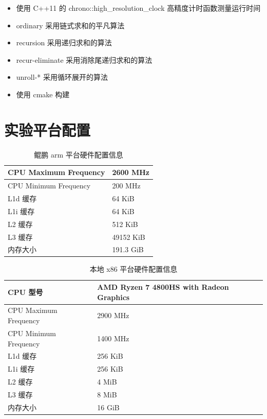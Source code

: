 \documentclass[a4paper]{article}
\begin{document}
\begin{itemize}
  \item 使用 C++11 的 chrono::high_resolution_clock 高精度计时函数测量运行时间
  \item ordinary 采用链式求和的平凡算法
  \item recursion 采用递归求和的算法
  \item recur-eliminate 采用消除尾递归求和的算法
  \item unroll-* 采用循环展开的算法
  \item 使用 cmake 构建
\end{itemize}

\section{实验平台配置}
\begin{table}[]
  \centering
  \begin{tabular}{ll}
    \hline
    CPU Maximum Frequency & 2600 MHz  \\   \hline
    CPU Minimum Frequency & 200 MHz   \\   \hline
    L1d 缓存              & 64 KiB    \\   \hline
    L1i 缓存              & 64 KiB    \\   \hline
    L2 缓存               & 512 KiB   \\   \hline
    L3 缓存               & 49152 KiB \\   \hline
    内存大小              & 191.3 GiB \\   \hline
  \end{tabular}
  \caption{鲲鹏 arm 平台硬件配置信息}
  \label{tab:arm-arch}
\end{table}

\begin{table}[]
  \centering
  \begin{tabular}{ll}
    \hline
    CPU 型号              & AMD Ryzen 7 4800HS with Radeon Graphics \\   \hline
    CPU Maximum Frequency & 2900 MHz                                \\   \hline
    CPU Minimum Frequency & 1400 MHz                                \\   \hline
    L1d 缓存              & 256 KiB                                 \\   \hline
    L1i 缓存              & 256 KiB                                 \\   \hline
    L2 缓存               & 4 MiB                                   \\   \hline
    L3 缓存               & 8 MiB                                   \\   \hline
    内存大小              & 16 GiB                                  \\   \hline
  \end{tabular}
  \caption{本地 x86 平台硬件配置信息}
  \label{tab:x86-arch}
\end{table}
\end{document}
